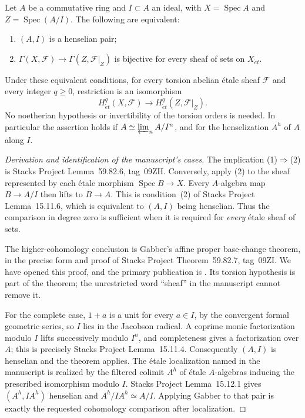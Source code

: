 \begin{theorem}\label{B:henselian}
Let $A$ be a commutative ring and $I\subset A$ an ideal, with $X=\operatorname{Spec}A$ and $Z=\operatorname{Spec}(A/I)$. The following are equivalent:
\begin{enumerate}
\item $(A,I)$ is a henselian pair;
\item $\Gamma(X,\mathcal F)\to\Gamma(Z,\mathcal F|_Z)$ is bijective for every sheaf of sets on $X_{\acute et}$.
\end{enumerate}
Under these equivalent conditions, for every torsion abelian \'etale sheaf $\mathcal F$ and every integer $q\ge0$, restriction is an isomorphism
\[
 H^q_{\acute et}(X,\mathcal F)\longrightarrow H^q_{\acute et}(Z,\mathcal F|_Z).
\]
No noetherian hypothesis or invertibility of the torsion orders is needed. In particular the assertion holds if $A\simeq\varprojlim_n A/I^n$, and for the henselization $A^h$ of $A$ along $I$.
\end{theorem}
\begin{proof}[Derivation and identification of the manuscript's cases]
The implication (1)$\Rightarrow$(2) is Stacks Project Lemma~59.82.6, tag~09ZH. Conversely, apply (2) to the sheaf represented by each \'etale morphism $\operatorname{Spec}B\to X$. Every $A$-algebra map $B\to A/I$ then lifts to $B\to A$. This is condition~(2) of Stacks Project Lemma~15.11.6, which is equivalent to $(A,I)$ being henselian. Thus the comparison in degree zero is sufficient when it is required for \emph{every} \'etale sheaf of sets.

The higher-cohomology conclusion is Gabber's affine proper base-change theorem, in the precise form and proof of Stacks Project Theorem~59.82.7, tag~09ZI. We have opened this proof, and the primary publication is \cite{BGabber1994}. Its torsion hypothesis is part of the theorem; the unrestricted word ``sheaf'' in the manuscript cannot remove it.

For the complete case, $1+a$ is a unit for every $a\in I$, by the convergent formal geometric series, so $I$ lies in the Jacobson radical. A coprime monic factorization modulo $I$ lifts successively modulo $I^n$, and completeness gives a factorization over $A$; this is precisely Stacks Project Lemma~15.11.4. Consequently $(A,I)$ is henselian and the theorem applies. The \'etale localization named in the manuscript is realized by the filtered colimit $A^h$ of \'etale $A$-algebras inducing the prescribed isomorphism modulo $I$. Stacks Project Lemma~15.12.1 gives $(A^h,IA^h)$ henselian and $A^h/IA^h\simeq A/I$. Applying Gabber to that pair is exactly the requested cohomology comparison after localization.
\end{proof}

